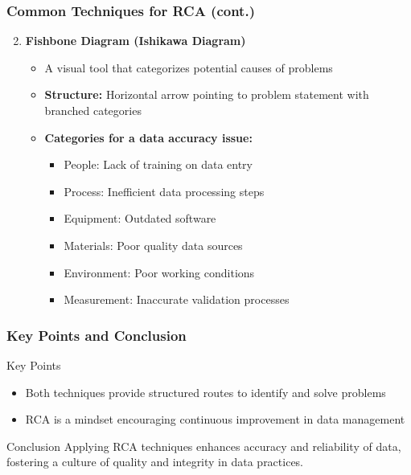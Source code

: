 \documentclass{beamer}
\begin{document}
\begin{frame}[fragile]
    \frametitle{Common Techniques for RCA (cont.)}
    \begin{enumerate}
        \setcounter{enumi}{1}
        \item \textbf{Fishbone Diagram (Ishikawa Diagram)}
        \begin{itemize}
            \item A visual tool that categorizes potential causes of problems
            \item \textbf{Structure:} Horizontal arrow pointing to problem statement with branched categories
            \item \textbf{Categories for a data accuracy issue:}
            \begin{itemize}
                \item People: Lack of training on data entry
                \item Process: Inefficient data processing steps
                \item Equipment: Outdated software
                \item Materials: Poor quality data sources
                \item Environment: Poor working conditions
                \item Measurement: Inaccurate validation processes
            \end{itemize}
        \end{itemize}
    \end{enumerate}
\end{frame}

\begin{frame}[fragile]
    \frametitle{Key Points and Conclusion}
    \begin{block}{Key Points}
        \begin{itemize}
            \item Both techniques provide structured routes to identify and solve problems
            \item RCA is a mindset encouraging continuous improvement in data management
        \end{itemize}
    \end{block}
    \begin{block}{Conclusion}
        Applying RCA techniques enhances accuracy and reliability of data, fostering a culture of quality and integrity in data practices.
    \end{block}
\end{frame}
\end{document}
